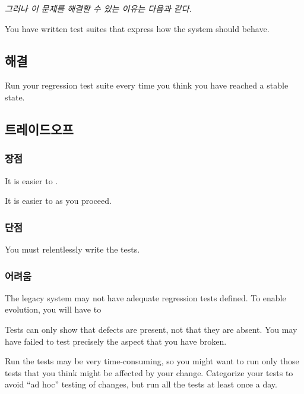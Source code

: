 \documentclass[a4paper,10pt,twoside]{book}
\begin{document}
\emph{그러나 이 문제를 해결할 수 있는 이유는 다음과 같다.}

\begin{bulletlist}
\item You have written test suites that express how the system should behave.
\end{bulletlist}

\subsection*{해결}

Run your regression test suite every time you think you have reached a stable state.

\subsection*{트레이드오프}

\subsubsection*{장점}

\begin{bulletlist}
\item It is easier to .

\item It is easier to  as you proceed.
\end{bulletlist}

\subsubsection*{단점}

\begin{bulletlist}
\item You must relentlessly write the tests. 
\end{bulletlist}

\subsubsection*{어려움}

\begin{bulletlist}
\item The legacy system may not have adequate regression tests defined. To enable evolution, you will have to 

\item Tests can only show that defects are present, not that they are absent. You may have failed to test precisely the aspect that you have broken.

\item Run the tests may be very time-consuming, so you might want to run only those tests that you think might be affected by your change. Categorize your tests to avoid ``ad hoc'' testing of changes, but run all the tests at least once a day.
\end{bulletlist}
\end{document}
